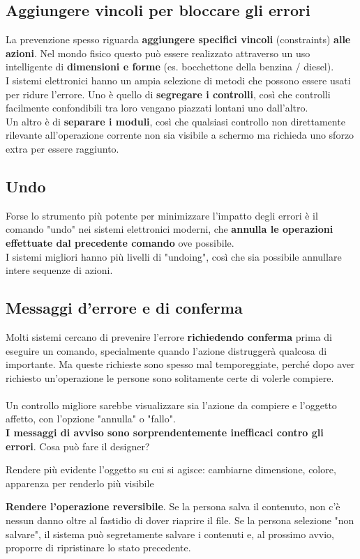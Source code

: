 \documentclass[10pt]{article}
\begin{document}
\subsection{Aggiungere vincoli per bloccare gli errori}
La prevenzione spesso riguarda \textbf{aggiungere specifici vincoli} (constraints) \textbf{alle azioni}. Nel mondo fisico questo può essere realizzato attraverso un uso intelligente di \textbf{dimensioni e forme} (es. bocchettone della benzina / diesel).\\
I sistemi elettronici hanno un ampia selezione di metodi che possono essere usati per ridure l'errore. Uno è quello di \textbf{segregare i controlli}, così che controlli facilmente confondibili tra loro vengano piazzati lontani uno dall'altro.\\
Un altro è di \textbf{separare i moduli}, così che qualsiasi controllo non direttamente rilevante all'operazione corrente non sia visibile a schermo ma richieda uno sforzo extra per essere raggiunto.
\subsection{Undo}
Forse lo strumento più potente per minimizzare l'impatto degli errori è il comando "undo" nei sistemi elettronici moderni, che \textbf{annulla le operazioni effettuate dal precedente comando} ove possibile.\\
I sistemi migliori hanno più livelli di "undoing", così che sia possibile annullare intere sequenze di azioni.
\subsection{Messaggi d'errore e di conferma}
Molti sistemi cercano di prevenire l'errore \textbf{richiedendo conferma} prima di eseguire un comando, specialmente quando l'azione distruggerà qualcosa di importante. Ma queste richieste sono spesso mal temporeggiate, perché dopo aver richiesto un'operazione le persone sono solitamente certe di volerle compiere.\\\\
Un controllo migliore sarebbe visualizzare sia l'azione da compiere e l'oggetto affetto, con l'opzione "annulla" o "fallo".\\
\textbf{I messaggi di avviso sono sorprendentemente inefficaci contro gli errori}. Cosa può fare il designer?
\begin{list}{}{}
\item Rendere più evidente l'oggetto su cui si agisce: cambiarne dimensione, colore, apparenza per renderlo più visibile
\item \textbf{Rendere l'operazione reversibile}. Se la persona salva il contenuto, non c'è nessun danno oltre al fastidio di dover riaprire il file. Se la persona selezione "non salvare", il sistema può segretamente salvare i contenuti e, al prossimo avvio, proporre di ripristinare lo stato precedente.
\end{list}
\end{document}
